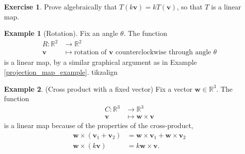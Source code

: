 \documentclass[a4paper,11pt]{book}
\theoremstyle{definition}
\newtheorem{exercise}{Exercise}
\newtheorem{example_environment}{Example}[chapter]
\newcommand{\ve}[1]{\mathbf{#1}}
\newenvironment{example}
	{
		\begin{oframed} 
		\begin{example_environment}
	}
	{
		\end{example_environment}
		\end{oframed}
	}
\begin{document}
\begin{exercise} Prove algebraically that $T(k \ve{v}) = k T(\ve{v})$, so that $T$ is a linear map.
\end{exercise}
\begin{example}[Rotation] \label{rotation_as_linear_map}Fix an angle $\theta$. The function 
\begin{align*}
R : \mathbb{R}^2 & \rightarrow \mathbb{R}^2 \\
 \ve{v} & \mapsto \mbox{rotation of $\ve{v}$ counterclockwise through angle $\theta$}
\end{align*}
is a linear map, by a similar graphical argument as in Example \ref{projection_map_example}. 
tikzalign
\begin{center}
\end{center}
		

\end{example}


\begin{example}(Cross product with a fixed vector) \label{cross_prod_as_linear_map}Fix a vector $\ve{w} \in \mathbb{R}^3$. The function 
\begin{align*}
  C : \mathbb{R}^3 &\rightarrow \mathbb{R}^3 \\
   \ve{v} & \mapsto \ve{w} \times \ve{v}
\end{align*}
is a linear map because of the properties of the cross-product,
\begin{align*}
 \ve{w} \times (\ve{v}_1 + \ve{v}_2) &= \ve{w} \times \ve{v}_1 + \ve{w} \times \ve{v}_2 \\
  \ve{w} \times (k \ve{v}) &= k \ve{w} \times \ve{v}.
\end{align*}
\end{example}
\end{document}
